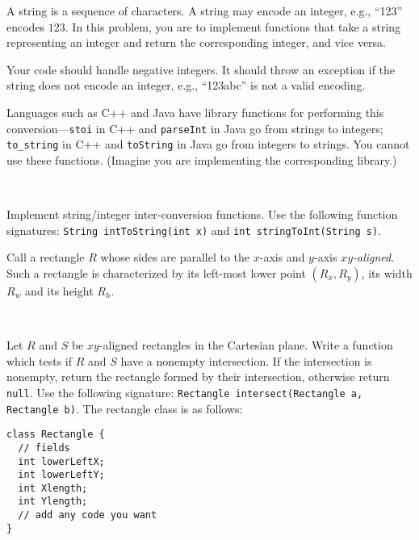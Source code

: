 \documentclass{jhwhw}
\newcommand{\myindex}[1]{%
}
\newcommand{\task}{%
\mbox{ }\\ %
\noindent{\bf Task:}
}
\begin{document}

A \myindex{string}string is a sequence of characters. A 
\myindex{string}string may encode an integer, e.g., ``123'' encodes $123$.
In this problem, you are to implement functions
that take a \myindex{string}string representing an integer and return the corresponding integer, and vice versa.

Your code should handle negative integers. It should throw an exception
if the \myindex{string}string does not encode an integer, e.g., ``123abc'' is not a valid encoding.

Languages such as C++ and Java have library functions for performing this conversion---\texttt{stoi}
in C++ and \texttt{parseInt} in Java go from \myindex{string}strings to integers;
\texttt{to\_string} in C++ and \texttt{toString} in Java go from integers to \myindex{string}strings.
You cannot use these functions. (Imagine you are implementing the corresponding library.)

\task
Implement \myindex{string}string/integer inter-conversion functions. Use the following function signatures:
\texttt{String intToString(int x)} and \texttt{int stringToInt(String s)}.

% 
% 


Call a rectangle $R$ whose sides are parallel to the $x$-axis and $y$-axis \emph{$xy$-aligned}.
Such a rectangle is characterized by its left-most lower point $(R_x,R_y)$,
its width $R_w$ and its \myindex{height!of a rectangle}height $R_h$.

\task
Let $R$ and $S$ be $xy$-aligned rectangles in the Cartesian plane. Write a function
which tests if $R$ and $S$ have a nonempty intersection. If the intersection
is nonempty, return the rectangle formed by their intersection, otherwise return \texttt{null}.
Use the following signature: \texttt{Rectangle intersect(Rectangle a, Rectangle b)}. The 
rectangle class is as follows:
\begin{verbatim}
class Rectangle {
  // fields
  int lowerLeftX;
  int lowerLeftY;
  int Xlength;
  int Ylength;
  // add any code you want
}
\end{verbatim}
\end{document}
